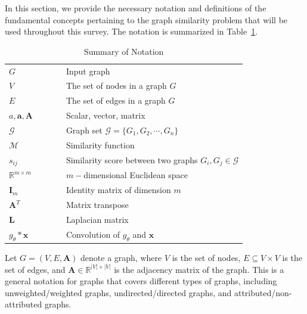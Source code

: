 \label{sec:prelims}
In this section, we provide the necessary notation and definitions of the fundamental concepts pertaining to the graph similarity problem that will be used throughout this survey.  The notation is summarized in Table~\ref{tab:notation}.
\begin{table}
\begin{center}
\caption{Summary of Notation}
\label{tab:notation}
\begin{tabular}{lllll}
\toprule
$G$ & & & & Input graph\\
$V$& & & & The set of nodes in a graph $G$\\
$E$& & & & The set of edges in a graph $G$\\
$a,\mathbf{a},\mathbf{A}$& & & & Scalar, vector, matrix\\
$\mathcal{G}$ & & & & Graph set $\mathcal{G} = \{G_1,G_2,\cdots ,G_n\}$\\
$\mathcal{M}$ & & & & Similarity function\\
$s_{ij}$ & & & & Similarity score between two graphs $G_i , G_j \in \mathcal{G}$\\
$\mathbb{R}^{m\times m}$& & & & $m-$dimensional Euclidean space\\
$\mathbf{I}_m$& & & & Identity matrix of dimension $m$ \\
$\mathbf{A}^T$& & & & Matrix transpose\\
$\mathbf{L}$& & & & Laplacian matrix\\
$g_\theta*\mathbf{x}$& & & & Convolution of $g_\theta$ and $\mathbf{x}$ \\
\bottomrule
\end{tabular}
\end{center}
\vspace{-3mm}
\end{table}
Let $G = (V,E,\mathbf{A})$ denote a graph, where $V$ is the set of nodes, $E \subseteq V \times V$ is the set of edges, and $\mathbf{A} \in \mathbb{R}^{|V| \times |V|}$ is the adjacency matrix of the graph. This is a general notation for graphs that covers different types of graphs, including unweighted/weighted graphs, undirected/directed graphs, and attributed/non-attributed graphs.
